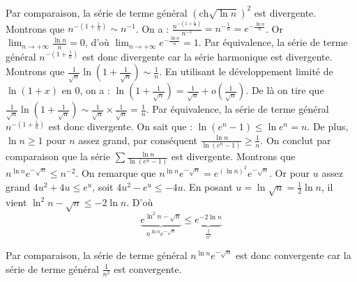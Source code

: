{{Par comparaison, la série de terme  général $(\mathrm{ch}\sqrt{\ln n })^{2}$ est divergente.
Montrons que $n^{-\left(1+\frac{1}{n}\right) } \sim n^{-1}$. On a : 
$\displaystyle 
\frac{ n^{-\left(1+\frac{1}{n}\right) } }{ n^{-1} } = n^{-\frac{1}{n}} = e^{-\frac{\ln n }{n}}$.
Or $\lim_{n \to + \infty} \frac{\ln n }{n} = 0$, d'où $\lim_{n \to + \infty} e^{-\frac{\ln n }{n}} = 1$.
Par équivalence, la série de terme  général $n^{-\left(1+\frac{1}{n}\right) } $ est donc divergente 
car la série harmonique est divergente.
Montrons que $\frac{1}{\sqrt{n}}\ln{\left(1+\frac{1}{\sqrt{n}}\right)} \sim \frac{1}{n}$.
En utilisant le développement limité de $\ln (1 +x)$ en $0$, on a :
$\ln \left(1+\frac{1}{\sqrt{n}}\right) = \frac{1}{\sqrt{n}} + o\left(\frac{1}{\sqrt{n}}\right)$.
De là on tire que $\frac{1}{\sqrt{n}}\ln{\left(1+\frac{1}{\sqrt{n}}\right)} 
\sim \frac{1}{\sqrt{n}} \times \frac{1}{\sqrt{n}} = \frac{1}{n}$.
Par équivalence, la série de terme général $n^{-\left(1+\frac{1}{n}\right) }$ est donc divergente.
On sait que :
$\ln{(e^n-1)} \le \ln{e^n} = n$. De plus, $ \ln n \ge 1$ pour $n$  assez grand, par conséquent
$\frac{\ln n}{\ln (e^n-1)} \ge \frac{1}{n}$. On conclut par comparaison 
que la série $\sum \frac{\ln n }{\ln{(e^n-1)}}$ est divergente.
Montrons que $n^{\ln n }e^{-\sqrt{n}} \le n^{-2}$.
On remarque que $ n^{\ln n }e^{-\sqrt{n}} = e^{(\ln n)^2}e^{-\sqrt{n}}$. 
Or pour $u$ assez grand $4u^2 + 4u \le e^u $, soit $4u^2 - e^u \le - 4u$.
En posant $u = \ln \sqrt{n} = \frac{1}{2} \ln n$, il vient $\ln^2{n} - \sqrt{n} \le -2\ln n$.
D'où 
\[
\underbrace{e^{\ln^2{n}-\sqrt{n}}}_{n^{\ln n }e^{-\sqrt{n}}} \le \underbrace{e^{-2\ln n }}_{\frac{1}{n^2}}
\]

Par comparaison, la série de terme général $n^{\ln n }e^{-\sqrt{n} }$ est donc convergente 
car la série de terme général $\frac{1}{n^2}$ est convergente.
}
}
